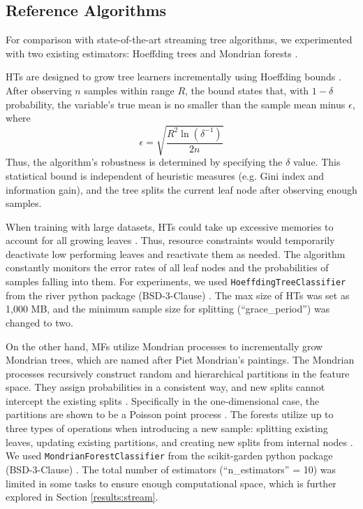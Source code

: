 \subsection{Reference Algorithms}
For comparison with state-of-the-art streaming tree algorithms, we experimented with two existing estimators: Hoeffding trees and Mondrian forests \citep{domingos_mining_2000, lakshminarayanan_mondrian_2014, khannouz_benchmark_2020, pfahringer_new_2007, gomes_machine_2019, lakshminarayanan_mondrian_2016}. 

HTs are designed to grow tree learners incrementally using Hoeffding bounds \citep{domingos_mining_2000, hoeffding_probability_1994}. 
After observing $n$ samples within range $R$, the bound states that, with $1 - \delta$ probability, the variable's true mean is no smaller than the sample mean minus $\epsilon$, where 
\begin{equation*} \epsilon=\sqrt{\frac{R^2\ln(\delta^{-1})}{2n}} \tag{1} \end{equation*}
Thus, the algorithm's robustness is determined by specifying the $\delta$ value.
This statistical bound is independent of heuristic measures (e.g. Gini index and information gain), and the tree splits the current leaf node after observing enough samples.

When training with large datasets, HTs could take up excessive memories to account for all growing leaves \citep{domingos_mining_2000, lavanya_handwritten_2017}. Thus, resource constraints would temporarily deactivate low performing leaves and reactivate them as needed. The algorithm constantly monitors the error rates of all leaf nodes and the probabilities of samples falling into them. 
For experiments, we used \texttt{HoeffdingTreeClassifier} from the river python package (BSD-3-Clause) \citep{montiel_river_2020}. The max size of HTs was set as 1,000 MB, and the minimum sample size for splitting (``grace\_period'') was changed to two.

On the other hand, MFs utilize Mondrian processes to incrementally grow Mondrian trees, which are named after Piet Mondrian's paintings\citep{lakshminarayanan_mondrian_2014, roy_mondrian_2009}. The Mondrian processes recursively construct random and hierarchical partitions in the feature space. They assign probabilities in a consistent way, and new splits cannot intercept the existing splits \citep{lakshminarayanan_mondrian_2014}. Specifically in the one-dimensional case, the partitions are shown to be a Poisson point process \citep{roy_mondrian_2009}. The forests utilize up to three types of operations when introducing a new sample: splitting existing leaves, updating existing partitions, and creating new splits from internal nodes \citep{lakshminarayanan_mondrian_2014}.
We used \texttt{MondrianForestClassifier} from the scikit-garden python package (BSD-3-Clause) \citep{kumar_scikit-gardenscikit-garden_2017}. The total number of estimators (``n\_estimators'' = 10) was limited in some tasks to ensure enough computational space, which is further explored in Section \ref{results:stream}.

